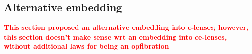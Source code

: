 \documentclass[a4paper,10pt]{article}
\newcommand{\finish}[1]{#1}
\newcommand{\comment}[1]{\finish{\textbf{\textcolor{red}{#1}}}}
\begin{document}
\subsection{Alternative embedding}
  \comment{This section proposed an alternative embedding into c-lenses; however, this section doesn't make sense wrt an embedding into ce-lenses, without additional laws for being an opfibration}
%   
%   
% 
%   
%   
\end{document}

